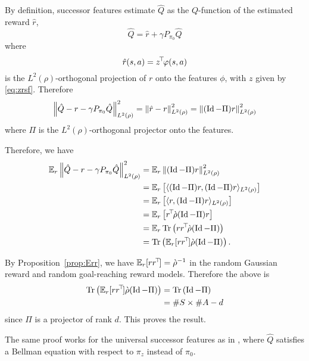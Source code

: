 \documentclass[11pt,a4paper]{article}
\newcommand{\drho}{\grave \rho}
\begin{document}
\begin{dem}
By definition, successor features estimate $\hat Q$ as
the $Q$-function of the estimated reward $\hat r$,
\begin{equation}
\hat Q=\hat r+ \gamma P_{\pi_0} \hat Q
\end{equation}
where
\begin{equation}
\hat r(s,a)=z^{\!\top}\!\varphi(s,a)
\end{equation}
is the $L^2(\rho)$-orthogonal projection of $r$ onto the features $\phi$,
with $z$ given by \eqref{eq:zrsf}. Therefore
\begin{equation}
\left\lVert\hat Q-r-\gamma P_{\pi_0} \hat Q\right\rVert^2_{L^2(\rho)}=\left\lVert\hat
r-r\right\rVert^2_{L^2(\rho)}=\left\lVert(\operatorname{Id}-\Pi)r\right\rVert^2_{L^2(\rho)}
\end{equation}
where $\Pi$ is the $L^2(\rho)$-orthogonal projector onto the features.

Therefore, we have
\begin{align}
\E_r \norm{\hat Q-r-\gamma P_{\pi_0} \hat Q}^2_{L^2(\rho)}
&=
\E_r \norm{(\Id-\Pi)r}^2_{L^2(\rho)}
\\&=\E_r \left[
\langle (\Id-\Pi)r, (\Id-\Pi)r \rangle_{L^2(\rho)}\right]
\\&=\E_r \left[\langle r, (\Id-\Pi)r \rangle_{L^2(\rho)}\right]
\\&=\E_r \left[\transp{r} \drho (\Id-\Pi)r\right]
\\&=\E_r \Tr\left(
r\transp{r}\drho (\Id-\Pi)
\right)
\\&= \Tr\left( \E_r[r\transp{r}] \drho (\Id-\Pi)\right).
\end{align}

By Proposition~\ref{prop:Err}, we have $\E_r[r\transp{r}]=\drho^{-1}$ in
the random Gaussian reward and random goal-reaching reward models.
Therefore the above is
\begin{align}
\Tr\left( \E_r[r\transp{r}] \drho (\Id-\Pi)\right)
&= \Tr\left( \Id-\Pi\right)
\\&=\#S\times \#A - d
\end{align}
since $\Pi$ is a projector of rank $d$. This proves the result.

The same proof works for the universal successor features as in
\cite{borsa2018universal}, where $\hat Q$
satisfies a Bellman equation with respect to $\pi_z$ instead of $\pi_0$.
\end{dem}

\newpage



\end{document}
